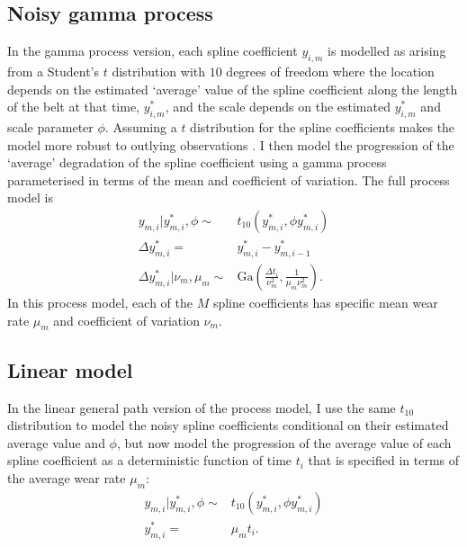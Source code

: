\subsection{Noisy gamma process} \label{subsec:belt-wear-gp}
In the gamma process version, each spline coefficient $y_{i,m}$ is modelled as arising from a Student's $t$ distribution with $10$ degrees of freedom where the location depends on the estimated `average' value of the spline coefficient along the length of the belt at that time, $y^*_{i,m}$, and the scale depends on the estimated $y^*_{i,m}$ and scale parameter $\phi$. Assuming a $t$ distribution for the spline coefficients makes the model more robust to outlying observations \citep[Chap.~17]{BDA2020}. I then model the progression of the `average' degradation of the spline coefficient using a gamma process parameterised in terms of the mean and coefficient of variation. The full process model is
\begin{align*}
  y_{m, i}|y^*_{m, i}, \phi      \sim & t_{10}\left(y^*_{m, i}, \phi y^*_{m, i}\right)                       \\
  \Delta  y^*_{m, i}                = & y^*_{m, i} - y^*_{m, i-1}                                                   \\
  \Delta y^*_{m, i}|\nu_m, \mu_m \sim & \mbox{Ga}\left( \frac{\Delta t_i}{\nu_m^2}, \frac{1}{\mu_m \nu_m^2} \right).
\end{align*}
In this process model, each of the $M$ spline coefficients has specific mean wear rate $\mu_m$ and coefficient of variation $\nu_m$.

\subsection{Linear model} \label{subsec:belt-wear-lm}
In the linear general path version of the process model, I use the same $t_{10}$ distribution to model the noisy spline coefficients conditional on their estimated average value and $\phi$, but now model the progression of the average value of each spline coefficient as a deterministic function of time $t_i$ that is specified in terms of the average wear rate $\mu_m$:
\begin{align*}
  y_{m, i}|y^*_{m, i}, \phi \sim & t_{10}\left(y^*_{m, i}, \phi y^*_{m, i}\right)  \\
  y^*_{m, i}                   = & \mu_m t_{i}.
\end{align*}

